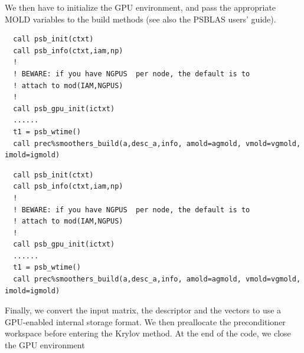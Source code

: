 We then have to initialize the GPU environment, and pass the
appropriate MOLD variables to the build methods (see also the PSBLAS
users' guide).
\begin{listing}[h!]
\ifpdf
\begin{verbatim}
  call psb_init(ctxt)
  call psb_info(ctxt,iam,np)
  !
  ! BEWARE: if you have NGPUS  per node, the default is to
  ! attach to mod(IAM,NGPUS)
  !
  call psb_gpu_init(ictxt)
  ......
  t1 = psb_wtime()
  call prec%smoothers_build(a,desc_a,info, amold=agmold, vmold=vgmold, imold=igmold)

\end{verbatim}
\else
\begin{center}
\begin{minipage}{.90\textwidth}
{\small
\begin{verbatim}
  call psb_init(ctxt)
  call psb_info(ctxt,iam,np)
  !
  ! BEWARE: if you have NGPUS  per node, the default is to
  ! attach to mod(IAM,NGPUS)
  !
  call psb_gpu_init(ictxt)
  ......
  t1 = psb_wtime()
  call prec%smoothers_build(a,desc_a,info, amold=agmold, vmold=vgmold, imold=igmold)

 \end{verbatim}
}
\end{minipage}
\end{center}
\fi
\caption{setup of a GPU-enabled test program part two.\label{fig:gpu-ex2}}
\end{listing}
Finally, we convert the input matrix, the descriptor and the vectors
to use a GPU-enabled internal storage format. 
We then preallocate the preconditioner workspace before entering the
Krylov method. At the end of the code, we close the GPU environment 
